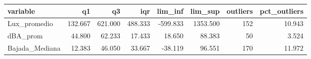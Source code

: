 \begin{tabular}{lrrrrrrr}
\toprule
variable & q1 & q3 & iqr & lim\_inf & lim\_sup & outliers & pct\_outliers \\
\midrule
Lux\_promedio & 132.667 & 621.000 & 488.333 & -599.833 & 1353.500 & 152 & 10.943 \\
dBA\_prom & 44.800 & 62.233 & 17.433 & 18.650 & 88.383 & 50 & 3.524 \\
Bajada\_Mediana & 12.383 & 46.050 & 33.667 & -38.119 & 96.551 & 170 & 11.972 \\
\bottomrule
\end{tabular}
